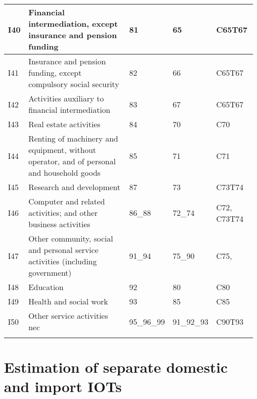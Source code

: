 \documentclass[12pt,english]{article}
\begin{document}
\begin{table}[ht]
\begin{adjustbox}{width=\textwidth}
\begin{tabular}{lp{500pt}lll}
		I40 & Financial intermediation, except insurance and pension funding & 81 & 65 & C65T67 \\ \midrule
		I41 & Insurance and pension funding, except compulsory social security  & 82 & 66 & C65T67 \\ \midrule
		I42 & Activities auxiliary to financial intermediation & 83 & 67 & C65T67 \\ \midrule
		I43 & Real estate activities & 84 & 70 & C70 \\ \midrule
		I44 & Renting of machinery and equipment, without operator, and of personal and household goods & 85 & 71 & C71 \\ \midrule
		I45 & Research and development  & 87 & 73 & C73T74 \\ \midrule
		I46 & Computer and related activities; and other business activities & 86\_88 & 72\_74 & C72, C73T74 \\ \midrule
		I47 & Other community, social and personal service activities (including government) & 91\_94 & 75\_90 & C75,  \\ \midrule
		I48 & Education & 92 & 80 & C80 \\ \midrule
		I49 & Health and social work & 93 & 85 & C85 \\ \midrule
		I50 & Other service activities nec & 95\_96\_99 & 91\_92\_93 & C90T93 \\
		\arrayrulecolor{black}\bottomrule	
	\end{tabular}
	\end{adjustbox}
	\thispagestyle{empty}
\end{table}

\clearpage
\section{Estimation of separate domestic and import IOTs}\label{IOTopti}
\end{document}
